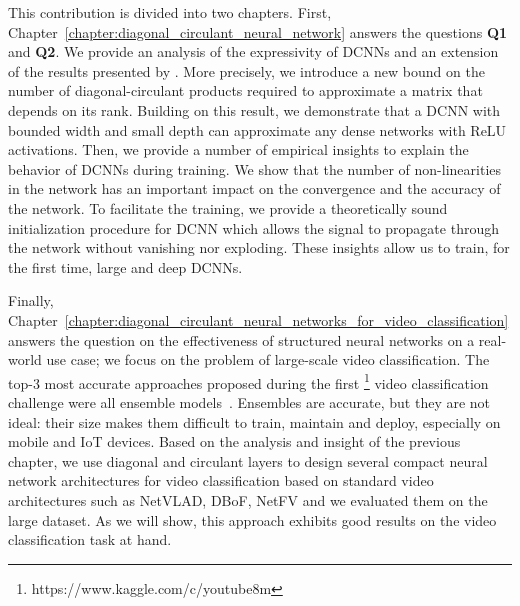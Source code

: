 This contribution is divided into two chapters.
First, Chapter~\ref{chapter:diagonal_circulant_neural_network} answers the questions \textbf{Q1} and \textbf{Q2}.
We provide an analysis of the expressivity of DCNNs and an extension of the results presented by \citet{huhtanen2015factoring}.
More precisely, we introduce a new bound on the number of diagonal-circulant products required to approximate a matrix that depends on its rank.
Building on this result, we demonstrate that a DCNN with bounded width and small depth can approximate any dense networks with ReLU activations.
Then, we provide a number of empirical insights to explain the behavior of DCNNs during training.
We show that the number of non-linearities in the network has an important impact on the convergence and the accuracy of the network.
To facilitate the training, we provide a theoretically sound initialization procedure for DCNN which allows the signal to propagate through the network without vanishing nor exploding.
These insights allow us to train, for the first time, large and deep DCNNs.

Finally, Chapter~\ref{chapter:diagonal_circulant_neural_networks_for_video_classification} answers the question on the effectiveness of structured neural networks on a real-world use case;
we focus on the problem of large-scale video classification. 
The top-3 most accurate approaches proposed during the first \yt\footnote{https://www.kaggle.com/c/youtube8m} video classification challenge  were all ensemble models~\cite{miech2017learnable,wang2017monkeytyping,li2017temporal}.
Ensembles are accurate, but they are not ideal: their size makes them difficult to train, maintain and deploy, especially on mobile and IoT devices. 
Based on the analysis and insight of the previous chapter, we use diagonal and circulant layers to design several compact neural network architectures for video classification based on standard video architectures such as NetVLAD, DBoF, NetFV and we evaluated them on the large \yt dataset.
As we will show, this approach exhibits good results on the video classification task at hand. 



